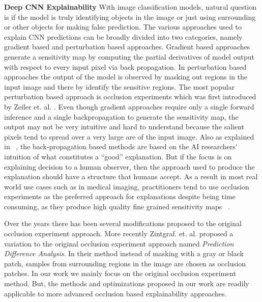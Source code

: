 \vspace{2mm}
\noindent \textbf{Deep CNN Explainability} With image classification models, natural question is if the model is truly identifying objects in the image or just using surrounding or other objects for making false prediction.
The various approaches used to explain CNN predictions can be broadly divided into two categories, namely gradient based and perturbation based approaches. Gradient based approaches generate a sensitivity map by computing the partial derivatives of model output with respect to every input pixel via back propagation.
In perturbation based approaches the output of the model is observed by masking out regions in the input image and there by identify the sensitive regions. The most popular perturbation based approach is occlusion experiments which was first introduced by Zeiler et. al. \cite{zeiler2014visualizing}.
Even though gradient approaches require only a single forward inference and a single backpropagation to generate the sensitivity map, the output may not be very intuitive and hard to understand because the salient pixels tend to spread over a very large are of the input image.
Also as explained in ~\cite{miller2017explanation}, the back-propagation based methods are based on the AI researchers\'~ intuition of what constitutes a ``good'' explanation. But if the focus is on explaining decision to a human observer, then the approach used to produce the explanation should have a structure that humans accept.
As a result in most real world use cases such as in medical imaging, practitioners tend to use occlusion experiments as the preferred approach for explanations despite being time consuming, as they produce high quality fine grained sensitivity maps ~\cite{jung2017deep}.

Over the years there has been several modifications proposed to the original occlusion experiment approach. More recently Zintgraf. et. al. \cite{zintgraf2017visualizing} proposed a variation to the original occlusion experiment approach named \textit{Prediction Difference Analysis}. In their method instead of masking with a gray or black patch, samples from surrounding regions in the image are chosen as occlusion patches.
In our work we mainly focus on the original occlusion experiment method. But, the methods and optimizations proposed in our work are readily applicable to more advanced occlusion based explainability approaches.